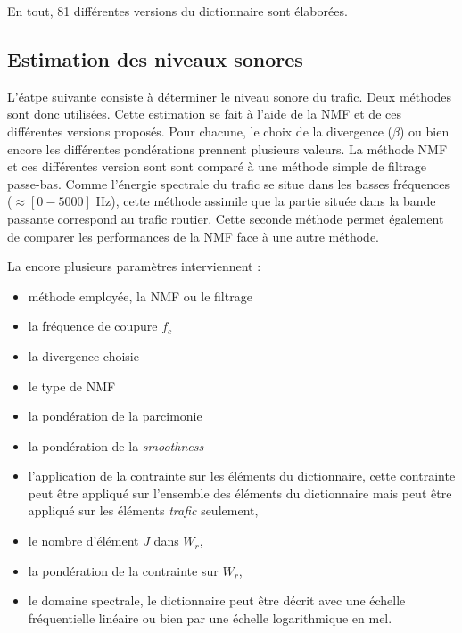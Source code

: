 En tout, 81 différentes versions du dictionnaire sont élaborées. 

\subsection{Estimation des niveaux sonores}
L'éatpe suivante consiste à déterminer le niveau sonore du trafic. Deux méthodes sont donc utilisées. Cette estimation se fait à l'aide de la NMF et de ces différentes versions proposés. Pour chacune, le choix de la divergence ($\beta$) ou bien encore les différentes pondérations prennent plusieurs valeurs. La méthode NMF et ces différentes version sont sont comparé à une méthode simple de filtrage passe-bas. Comme l'énergie spectrale du trafic se situe dans les basses fréquences ($\approx \left[0-5000 \right]$ Hz), cette méthode assimile que la partie située dans la bande passante correspond au trafic routier. Cette seconde méthode permet également de comparer les performances de la NMF face à une autre méthode. 

La encore plusieurs paramètres interviennent : 
\begin{itemize}
\item méthode employée, la NMF ou le filtrage
\item la fréquence de coupure $f_c$
\item la divergence choisie
\item le type de NMF
\item la pondération de la parcimonie
\item la pondération de la \textit{smoothness}
\item l'application de la contrainte sur les éléments du dictionnaire, cette contrainte peut être appliqué sur l'ensemble des éléments du dictionnaire mais peut être appliqué sur les éléments \textit{trafic} seulement,
\item le nombre d'élément $J$ dans $W_r$,
\item la pondération de la contrainte sur $W_r$,
\item le domaine spectrale, le dictionnaire peut être décrit avec une échelle fréquentielle linéaire ou bien par une échelle logarithmique en mel.
\end{itemize}

